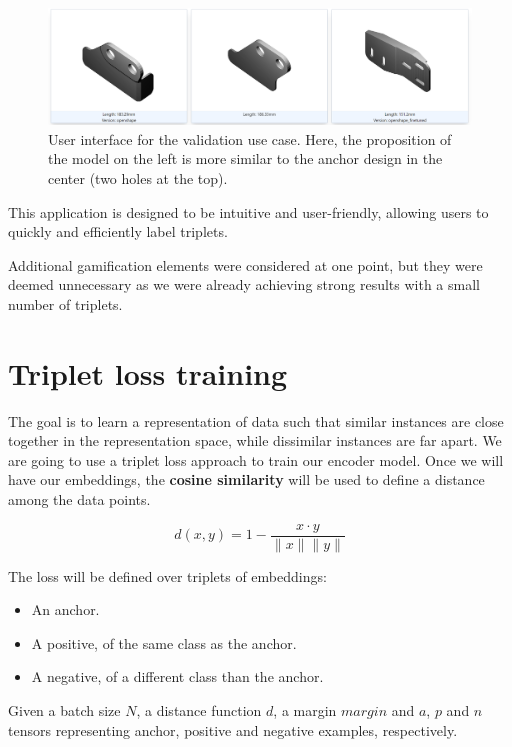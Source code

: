 \begin{figure}[]
  \centering
  \includegraphics[width=0.8\columnwidth]{images/tinder3d_validation.png}
  \caption{User interface for the validation use case. Here, the proposition of the model on the left is more similar to the anchor design in the center (two holes at the top).}
  \label{fig:validation_use_case}
\end{figure}

This application is designed to be intuitive and user-friendly, allowing users to quickly and efficiently label triplets.

Additional gamification elements were considered at one point, but they were deemed unnecessary as we were already achieving strong results with a small number of triplets.

\section{Triplet loss training}
\label{sec:triplet-loss-training}

The goal is to learn a representation of data such that similar instances are close together in the representation space, while dissimilar instances are far apart. We are going to use a triplet loss approach to train our encoder model. Once we will have our embeddings, the \textbf{cosine similarity} will be used to define a distance among the data points.

$$d(x, y) = 1 - \frac{x \cdot y}{\|x\| \|y\|}$$

The loss will be defined over triplets of embeddings:
\begin{itemize}
  \item An anchor.
  \item A positive, of the same class as the anchor.
  \item A negative, of a different class than the anchor.
\end{itemize}

\vspace{0.2cm}

Given a batch size $N$, a distance function $d$, a margin $margin$ and $a$, $p$ and $n$ tensors representing anchor, positive and negative examples, respectively.

